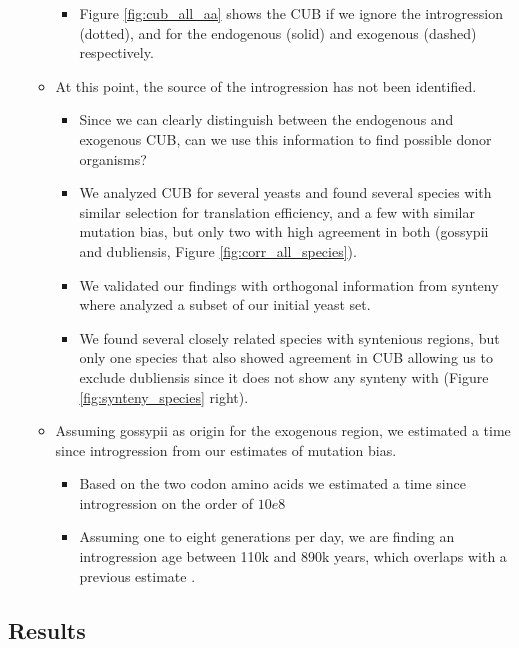 \documentclass[12pt]{article}
\begin{document}
\begin{itemize}
\begin{itemize}
\begin{itemize}
			\item Figure \ref{fig:cub_all_aa} shows the CUB if we ignore the introgression (dotted), and for the endogenous (solid) and exogenous (dashed) respectively.
		\end{itemize}
		\item At this point, the source of the introgression has not been identified.
		\begin{itemize}
			\item Since we can clearly distinguish between the endogenous and exogenous CUB, can we use this information to find possible donor organisms?
			\item We analyzed CUB for several yeasts and found several species with similar selection for translation efficiency, and a few with similar mutation bias, but only two with high agreement in both (gossypii and dubliensis, Figure \ref{fig:corr_all_species}).
			\item We validated our findings with orthogonal information from synteny where analyzed a subset of our initial yeast set.
			\item We found several closely related species with syntenious regions, but only one species that also showed agreement in CUB allowing us to exclude dubliensis since it does not show any synteny with \kluyveri (Figure \ref{fig:synteny_species} right).
		\end{itemize}
		\item Assuming gossypii as origin for the exogenous region, we estimated a time since introgression from our estimates of mutation bias.
		\begin{itemize}
			\item Based on the two codon amino acids we estimated a time since introgression on the order of $10e8$
			\item Assuming one to eight generations per day, we are finding an introgression age between 110k and 890k years, which overlaps with a previous estimate \citep{friedrich2015}.
		\end{itemize}
	\end{itemize}
\end{itemize}

\subsection*{Results}
\end{document}
